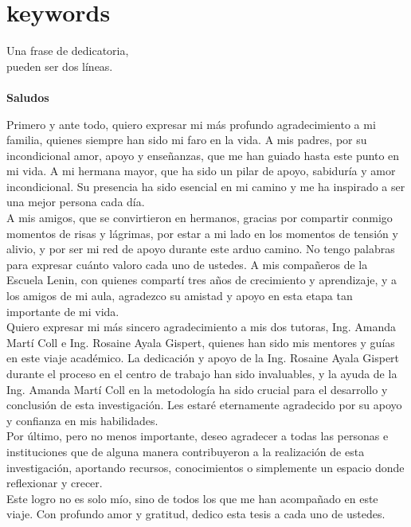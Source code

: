 \documentclass[
	spanish, %
	letterpaper, oneside
]{book}
\begin{document}
\section*{keywords}




\begin{dedicatory}
	Una frase de dedicatoria, \\
	pueden ser dos líneas. \\
	~ \\
	\textbf{Saludos}
\end{dedicatory}

\begin{acknowledgments}
	Primero y ante todo, quiero expresar mi más profundo agradecimiento a mi familia, quienes siempre han sido mi faro en la vida. A mis padres, por su incondicional amor, apoyo y enseñanzas, que me han guiado hasta este punto en mi vida. A mi hermana mayor, que ha sido un pilar de apoyo, sabiduría y amor incondicional. Su presencia ha sido esencial en mi camino y me ha inspirado a ser una mejor persona cada día.\\

A mis amigos, que se convirtieron en hermanos, gracias por compartir conmigo momentos de risas y lágrimas, por estar a mi lado en los momentos de tensión y alivio, y por ser mi red de apoyo durante este arduo camino. No tengo palabras para expresar cuánto valoro cada uno de ustedes. A mis compañeros de la Escuela Lenin, con quienes compartí tres años de crecimiento y aprendizaje, y a los amigos de mi aula, agradezco su amistad y apoyo en esta etapa tan importante de mi vida.\\

Quiero expresar mi más sincero agradecimiento a mis dos tutoras, Ing. Amanda Martí Coll e Ing. Rosaine Ayala Gispert, quienes han sido mis mentores y guías en este viaje académico. La dedicación y apoyo de la Ing. Rosaine Ayala Gispert durante el proceso en el centro de trabajo han sido invaluables, y la ayuda de la Ing. Amanda Martí Coll en la metodología ha sido crucial para el desarrollo y conclusión de esta investigación. Les estaré eternamente agradecido por su apoyo y confianza en mis habilidades.\\

Por último, pero no menos importante, deseo agradecer a todas las personas e instituciones que de alguna manera contribuyeron a la realización de esta investigación, aportando recursos, conocimientos o simplemente un espacio donde reflexionar y crecer.\\

Este logro no es solo mío, sino de todos los que me han acompañado en este viaje. Con profundo amor y gratitud, dedico esta tesis a cada uno de ustedes.
\end{acknowledgments}
\end{document}
